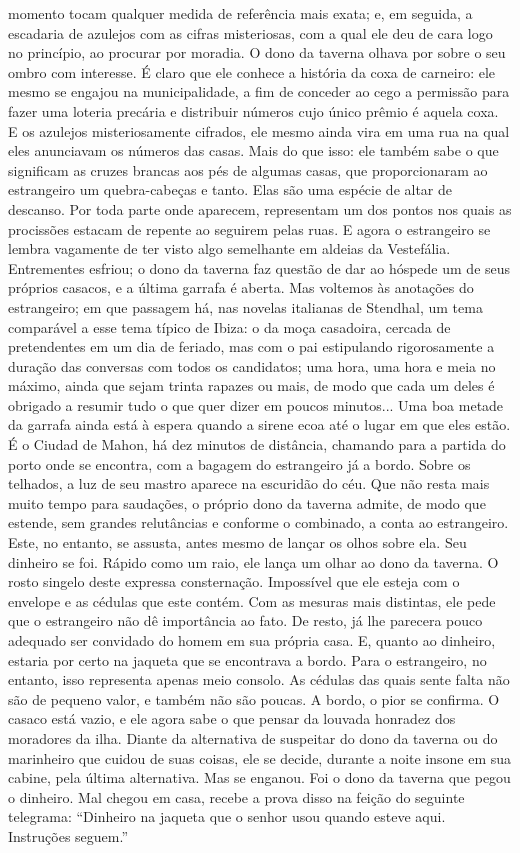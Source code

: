 momento tocam qualquer medida de referência mais exata; e, em seguida, a
escadaria de azulejos com as cifras misteriosas, com a qual ele deu de
cara logo no princípio, ao procurar por moradia. O dono da taverna
olhava por sobre o seu ombro com interesse. É claro que ele conhece a
história da coxa de carneiro: ele mesmo se engajou na municipalidade, a
fim de conceder ao cego a permissão para fazer uma loteria precária e
distribuir números cujo único prêmio é aquela coxa. E os azulejos
misteriosamente cifrados, ele mesmo ainda vira em uma rua na qual eles
anunciavam os números das casas. Mais do que isso: ele também sabe o que
significam as cruzes brancas aos pés de algumas casas, que
proporcionaram ao estrangeiro um quebra-cabeças e tanto. Elas são uma
espécie de altar de descanso. Por toda parte onde aparecem, representam
um dos pontos nos quais as procissões estacam de repente ao seguirem
pelas ruas. E agora o estrangeiro se lembra vagamente de ter visto algo
semelhante em aldeias da Vestefália. Entrementes esfriou; o dono da
taverna faz questão de dar ao hóspede um de seus próprios casacos, e a
última garrafa é aberta. Mas voltemos às anotações do estrangeiro; em
que passagem há, nas novelas italianas de Stendhal, um tema comparável a
esse tema típico de Ibiza: o da moça casadoira, cercada de pretendentes
em um dia de feriado, mas com o pai estipulando rigorosamente a duração
das conversas com todos os candidatos; uma hora, uma hora e meia no
máximo, ainda que sejam trinta rapazes ou mais, de modo que cada um
deles é obrigado a resumir tudo o que quer dizer em poucos minutos...
Uma boa metade da garrafa ainda está à espera quando a sirene ecoa até o
lugar em que eles estão. É o Ciudad de Mahon, há dez minutos de
distância, chamando para a partida do porto onde se encontra, com a
bagagem do estrangeiro já a bordo. Sobre os telhados, a luz de seu
mastro aparece na escuridão do céu. Que não resta mais muito tempo para
saudações, o próprio dono da taverna admite, de modo que estende, sem
grandes relutâncias e conforme o combinado, a conta ao estrangeiro.
Este, no entanto, se assusta, antes mesmo de lançar os olhos sobre ela.
Seu dinheiro se foi. Rápido como um raio, ele lança um olhar ao dono da
taverna. O rosto singelo deste expressa consternação. Impossível que ele
esteja com o envelope e as cédulas que este contém. Com as mesuras mais
distintas, ele pede que o estrangeiro não dê importância ao fato. De
resto, já lhe parecera pouco adequado ser convidado do homem em sua
própria casa. E, quanto ao dinheiro, estaria por certo na jaqueta que se
encontrava a bordo. Para o estrangeiro, no entanto, isso representa
apenas meio consolo. As cédulas das quais sente falta não são de pequeno
valor, e também não são poucas. A bordo, o pior se confirma. O casaco
está vazio, e ele agora sabe o que pensar da louvada honradez dos
moradores da ilha. Diante da alternativa de suspeitar do dono da taverna
ou do marinheiro que cuidou de suas coisas, ele se decide, durante a
noite insone em sua cabine, pela última alternativa. Mas se enganou. Foi
o dono da taverna que pegou o dinheiro. Mal chegou em casa, recebe a
prova disso na feição do seguinte telegrama: ``Dinheiro na jaqueta que o
senhor usou quando esteve aqui. Instruções seguem.''

